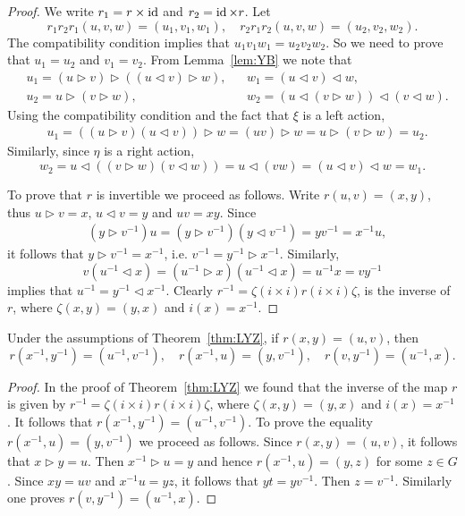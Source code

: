 \begin{proof}
We write $r_1=r\times\operatorname{id}$ and $r_2=\operatorname{id}\times r$. Let
\[
r_1r_2r_1(u,v,w)=(u_1,v_1,w_1),\quad
r_2r_1r_2(u,v,w)=(u_2,v_2,w_2).
\]
The compatibility condition implies that $u_1v_1w_1=u_2v_2w_2$. 
So we need to prove that $u_1=u_2$ and $v_1=v_2$. From Lemma~\ref{lem:YB}
we note that
\begin{align*}
&u_1=(u\rhd v)\rhd ( (u\lhd v)\rhd w),
&&w_1=(u\lhd v)\lhd w,\\
&u_2=u\rhd (v\rhd w),
&&w_2=(u\lhd (v\rhd w))\lhd (v\lhd w).
\end{align*}
Using the compatibility condition and the fact that $\xi$ is a left action, 
\begin{align*}
    &u_1=((u\rhd v)(u\lhd v))\rhd w=(uv)\rhd w=u\rhd (v\rhd w)=u_2.
\end{align*}
Similarly, since $\eta$ is a right action, 
\[
w_2=u\lhd ((v\rhd w)(v\lhd w))=u\lhd (vw)=(u\lhd v)\lhd w=w_1.
\]

To prove that $r$ is invertible we proceed as follows. 
Write $r(u,v)=(x,y)$, thus $u\rhd v=x$, $u\lhd v=y$ and $uv=xy$. Since 
\begin{align*}
& (y\rhd v^{-1})u=(y\rhd v^{-1})(y\lhd v^{-1})=yv^{-1}=x^{-1}u,
\end{align*}
it follows that $y\rhd v^{-1}=x^{-1}$, i.e. $v^{-1}=y^{-1}\rhd x^{-1}$. Similarly, 
\[
v(u^{-1}\lhd x)=(u^{-1}\rhd x)(u^{-1}\lhd x)=u^{-1}x=vy^{-1}
\]
implies that $u^{-1}=y^{-1}\lhd x^{-1}$. Clearly 
$r^{-1}=\zeta (i\times i) r (i\times i) \zeta$,
is the inverse of $r$, where $\zeta(x,y)=(y,x)$ and $i(x)=x^{-1}$. 
\end{proof}

\begin{proposition}
Under the assumptions of Theorem~\ref{thm:LYZ}, 
if $r(x,y)=(u,v)$, then 
\[
r(x^{-1},y^{-1})=(u^{-1},v^{-1}),
\quad
r(x^{-1},u)=(y,v^{-1}),
\quad
r(v,y^{-1})=(u^{-1},x).
\]
\end{proposition}

\begin{proof}
In the proof of Theorem~\ref{thm:LYZ} we found that 
the inverse of the map $r$ is given by $r^{-1}=\zeta (i\times i) r (i\times i) \zeta$,
where $\zeta(x,y)=(y,x)$ and $i(x)=x^{-1}$. It follows that $r(x^{-1},y^{-1})=(u^{-1},v^{-1})$.  
To prove the equality $r(x^{-1},u)=(y,v^{-1})$ we proceed as follows. Since $r(x,y)=(u,v)$, it 
follows that $x\triangleright y=u$. Then $x^{-1}\triangleright u=y$ and
hence $r(x^{-1},u)=(y,z)$ for some $z\in G$. 
Since $xy=uv$ and $x^{-1}u=yz$, it follows that $yt=yv^{-1}$. Then 
$z=v^{-1}$. Similarly one proves $r(v,y^{-1})=(u^{-1},x).$
\end{proof}

